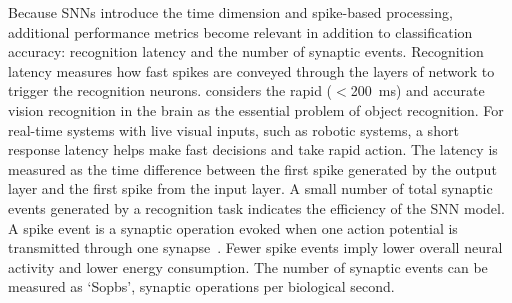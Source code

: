 Because SNNs introduce the time dimension and spike-based processing, additional performance metrics become relevant in addition to classification accuracy: recognition latency and the number of synaptic events.
Recognition latency measures how fast spikes are conveyed through the layers of network to trigger the recognition neurons.
\cite{dicarlo2012does} considers the rapid ($<$200~ms) and accurate vision recognition in the brain as the essential problem of object recognition.
For real-time systems with live visual inputs, such as robotic systems, a short response latency helps make fast decisions and take rapid action.
The latency is measured as the time difference between the first spike generated by the output layer and the first spike from the input layer.
A small number of total synaptic events generated by a recognition task indicates the efficiency of the SNN model.
A spike event is a synaptic operation evoked when one action potential is transmitted through one synapse~\cite{sharp2012power}.
Fewer spike events imply lower overall neural activity and lower energy consumption.
The number of synaptic events can be measured as `Sopbs', synaptic operations per biological second.
%			
